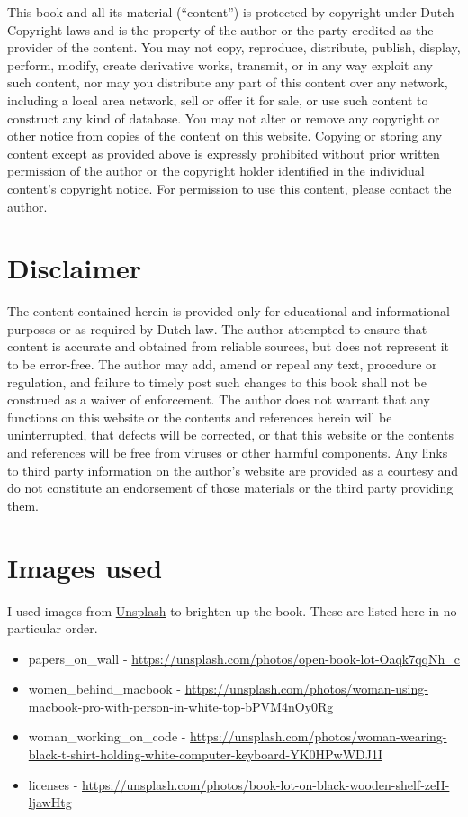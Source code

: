 \documentclass[
]{book}
\providecommand{\tightlist}{%
  \setlength{\itemsep}{0pt}\setlength{\parskip}{0pt}}
\begin{document}
This book and all its material (``content'') is protected by copyright under Dutch Copyright laws and is the property of the author or the party credited as the provider of the content. You may not copy, reproduce, distribute, publish, display, perform, modify, create derivative works, transmit, or in any way exploit any such content, nor may you distribute any part of this content over any network, including a local area network, sell or offer it for sale, or use such content to construct any kind of database. You may not alter or remove any copyright or other notice from copies of the content on this website. Copying or storing any content except as provided above is expressly prohibited without prior written permission of the author or the copyright holder identified in the individual content's copyright notice. For permission to use this content, please contact the author.

\hypertarget{disclaimer}{%
\section{Disclaimer}\label{disclaimer}}

The content contained herein is provided only for educational and informational purposes or as required by Dutch law. The author attempted to ensure that content is accurate and obtained from reliable sources, but does not represent it to be error-free. The author may add, amend or repeal any text, procedure or regulation, and failure to timely post such changes to this book shall not be construed as a waiver of enforcement. The author does not warrant that any functions on this website or the contents and references herein will be uninterrupted, that defects will be corrected, or that this website or the contents and references will be free from viruses or other harmful components. Any links to third party information on the author's website are provided as a courtesy and do not constitute an endorsement of those materials or the third party providing them.

\hypertarget{images-used}{%
\section{Images used}\label{images-used}}

I used images from \href{https://unsplash.com/s/photos/legal}{Unsplash} to brighten up the book. These are listed here in no particular order.

\begin{itemize}
\tightlist
\item
  papers\_on\_wall - \url{https://unsplash.com/photos/open-book-lot-Oaqk7qqNh_c}
\item
  women\_behind\_macbook - \url{https://unsplash.com/photos/woman-using-macbook-pro-with-person-in-white-top-bPVM4nOy0Rg}
\item
  woman\_working\_on\_code - \url{https://unsplash.com/photos/woman-wearing-black-t-shirt-holding-white-computer-keyboard-YK0HPwWDJ1I}
\item
  licenses - \url{https://unsplash.com/photos/book-lot-on-black-wooden-shelf-zeH-ljawHtg}
\end{itemize}
\end{document}
